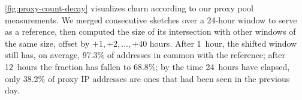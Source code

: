 \documentclass[letterpaper,twocolumn]{article}
\begin{document}
\autoref{fig:proxy-count-decay}
visualizes churn according to our proxy pool measurements.
We merged consecutive sketches over a 24-hour window
to serve as a reference,
then computed the size of its intersection
with other windows of the same size,
offset by \(+1, +2, \ldots, +40\) hours.
After 1~hour, the shifted window still has, on average,
97.3\% of addresses in common with the reference;
after 12~hours the fraction has fallen to 68.8\%;
by the time 24~hours have elapsed,
only 38.2\% of proxy IP addresses
are ones that had been seen in the previous day.
\end{document}
